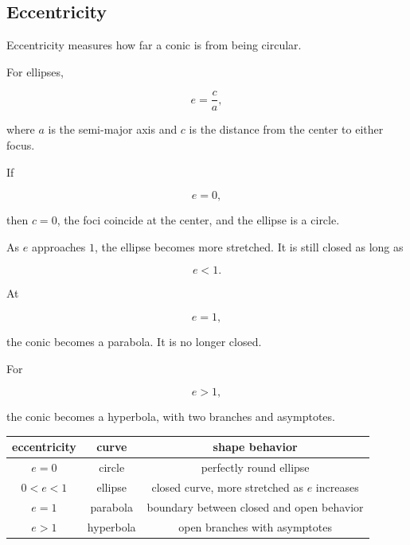 \subsection{Eccentricity}
\label{subsec:eccentricity}

Eccentricity measures how far a conic is from being circular.

For ellipses,

\[
e=\frac{c}{a},
\]

where \(a\) is the semi-major axis and \(c\) is the distance from the center to either
focus.

If

\[
e=0,
\]

then \(c=0\), the foci coincide at the center, and the ellipse is a circle.

As \(e\) approaches \(1\), the ellipse becomes more stretched.  It is still closed as long
as

\[
e<1.
\]

At

\[
e=1,
\]

the conic becomes a parabola.  It is no longer closed.

For

\[
e>1,
\]

the conic becomes a hyperbola, with two branches and asymptotes.

\begin{center}
\begin{tabular}{c|c|c}
\textbf{eccentricity} & \textbf{curve} & \textbf{shape behavior} \\ \hline
\(e=0\) & circle & perfectly round ellipse \\[3pt]
\(0<e<1\) & ellipse & closed curve, more stretched as \(e\) increases \\[3pt]
\(e=1\) & parabola & boundary between closed and open behavior \\[3pt]
\(e>1\) & hyperbola & open branches with asymptotes
\end{tabular}
\end{center}


